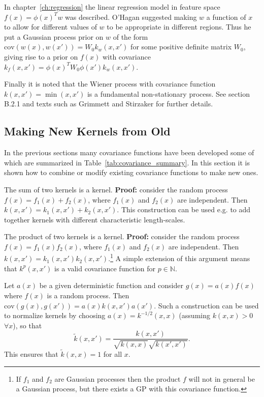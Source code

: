 \documentclass[11pt]{book}
\begin{document}
In chapter~\ref{ch:regression} the linear regression model in feature space $f(x) = \phi(x)^T w$ was described. O'Hagan \cite{ohagan1978} suggested making $w$ a function of $x$ to allow for different values of $w$ to be appropriate in different regions. Thus he put a Gaussian process prior on $w$ of the form $\text{cov}(w(x), w(x')) = W_0 k_w(x, x')$ for some positive definite matrix $W_0$, giving rise to a prior on $f(x)$ with covariance $k_f(x, x') = \phi(x)^T W_0 \phi(x') k_w(x, x')$.

Finally it is noted that the Wiener process with covariance function $k(x, x') = \min(x, x')$ is a fundamental non-stationary process. See section B.2.1 and texts such as Grimmett and Stirzaker \cite{grimmett1992} for further details.

\subsection{Making New Kernels from Old}
\label{sec:new_kernels}

In the previous sections many covariance functions have been developed some of which are summarized in Table~\ref{tab:covariance_summary}. In this section it is shown how to combine or modify existing covariance functions to make new ones.

The sum of two kernels is a kernel. \textbf{Proof:} consider the random process $f(x) = f_1(x) + f_2(x)$, where $f_1(x)$ and $f_2(x)$ are independent. Then $k(x, x') = k_1(x, x') + k_2(x, x')$. This construction can be used e.g. to add together kernels with different characteristic length-scales.

The product of two kernels is a kernel. \textbf{Proof:} consider the random process $f(x) = f_1(x) f_2(x)$, where $f_1(x)$ and $f_2(x)$ are independent. Then $k(x, x') = k_1(x, x') k_2(x, x')$.\footnote{If $f_1$ and $f_2$ are Gaussian processes then the product $f$ will not in general be a Gaussian process, but there exists a GP with this covariance function.} A simple extension of this argument means that $k^p(x, x')$ is a valid covariance function for $p \in \mathbb{N}$.

Let $a(x)$ be a given deterministic function and consider $g(x) = a(x) f(x)$ where $f(x)$ is a random process. Then $\text{cov}(g(x), g(x')) = a(x) k(x, x') a(x')$. Such a construction can be used to normalize kernels by choosing $a(x) = k^{-1/2}(x, x)$ (assuming $k(x, x) > 0$ $\forall x$), so that
\begin{equation}
\label{eq:normalized_kernel}
\tilde{k}(x, x') = \frac{k(x, x')}{\sqrt{k(x, x)} \sqrt{k(x', x')}}.
\end{equation}
This ensures that $\tilde{k}(x, x) = 1$ for all $x$.
\end{document}
